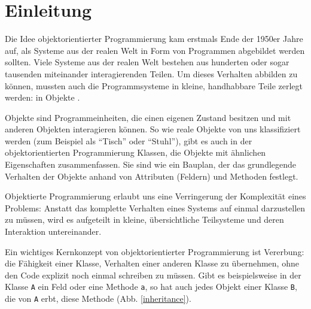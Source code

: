 \chapter{Einleitung} 
Die Idee objektorientierter Programmierung kam erstmals Ende der 1950er Jahre auf, als Systeme aus der realen Welt in Form von Programmen abgebildet werden sollten. Viele Systeme aus der realen Welt bestehen aus hunderten oder sogar tausenden miteinander interagierenden Teilen. Um dieses Verhalten abbilden zu können, mussten auch die Programmsysteme in kleine, handhabbare Teile zerlegt werden: in Objekte \cite{history}.

Objekte sind Programmeinheiten, die einen eigenen Zustand besitzen und mit anderen Objekten interagieren können. So wie reale Objekte von uns klassifiziert werden (zum Beispiel als ``Tisch'' oder ``Stuhl''), gibt es auch in der objektorientierten Programmierung Klassen, die Objekte mit ähnlichen Eigenschaften zusammenfassen. Sie sind wie ein Bauplan, der das grundlegende Verhalten der Objekte anhand von Attributen (Feldern) und Methoden festlegt.

Objektierte Programmierung erlaubt uns eine Verringerung der Komplexität eines Problems: Anstatt das komplette Verhalten eines Systems auf einmal darzustellen zu müssen, wird es aufgeteilt in kleine, übersichtliche Teilsysteme und deren Interaktion untereinander.

Ein wichtiges Kernkonzept von objektorientierter Programmierung ist Vererbung: die Fähigkeit einer Klasse, Verhalten einer anderen Klasse zu übernehmen, ohne den Code explizit noch einmal schreiben zu müssen. Gibt es beispielsweise in der Klasse \texttt{A} ein Feld oder eine Methode \texttt{a}, so hat auch jedes Objekt einer Klasse \texttt{B}, die von \texttt{A} erbt, diese Methode (Abb. \ref{inheritance}).

